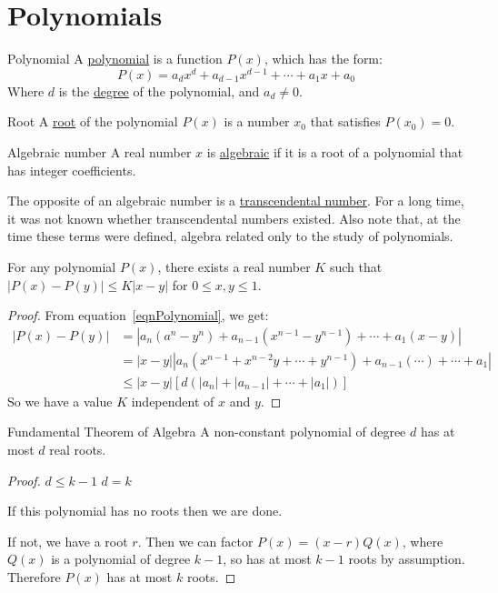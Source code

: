 \documentclass[../Main.tex]{subfiles}
\begin{document}
\section{Polynomials}
\begin{definition}{Polynomial}
    A \underline{polynomial} is a function $P(x)$, which has the form:
    \begin{equation}
        P(x) = a_d x^d + a_{d-1} x^{d-1} + \cdots + a_1 x + a_0
        \label{eqnPolynomial}
    \end{equation}
    Where $d$ is the \underline{degree} of the polynomial, and $a_d \neq 0$.
\end{definition}
\begin{definition}{Root}
    A \underline{root} of the polynomial $P(x)$ is a number $x_0$ that satisfies $P(x_0) = 0$.
\end{definition}
\begin{definition}{Algebraic number}
    A real number $x$ is \underline{algebraic} if it is a root of a polynomial that has integer coefficients.
\end{definition}
The opposite of an algebraic number is a \underline{transcendental number}. For a long time, it was not known whether transcendental numbers existed. Also note that, at the time these terms were defined, algebra related only to the study of polynomials.
\begin{lemma}
    For any polynomial $P(x)$, there exists a real number $K$ such that $|P(x) - P(y)| \leq K|x - y|$ for $0 \leq x, y \leq 1$.
    \label{lemPolynomialBounds}
\end{lemma}
\begin{proof}
    From equation~\ref{eqnPolynomial}, we get:
    \begin{align*}
        |P(x) - P(y)| &= |a_n(a^n - y^n) + a_{n-1}(x^{n-1} - y^{n-1}) + \cdots + a_1(x-y)| \\
        &= |x - y| |a_n(x^{n-1} + x^{n-2} y + \cdots + y^{n-1}) + a_{n-1} (\cdots) + \cdots + a_1| \\
        &\leq |x - y| \left[d(|a_n| + |a_{n-1}| + \cdots + |a_1|)\right]
    \end{align*}
    So we have a value $K$ independent of $x$ and $y$.
\end{proof}
\begin{theorem}{Fundamental Theorem of Algebra}
    A non-constant polynomial of degree $d$ has at most $d$ real roots.
    \label{thmFundamentalAlgebra}
\end{theorem}
\begin{proof}
    {$d \leq k - 1$}{}
    {$d = k$}{
        If this polynomial has no roots then we are done.\par
        If not, we have a root $r$. Then we can factor $P(x) = (x - r)Q(x)$, where $Q(x)$ is a polynomial of degree $k - 1$, so has at most $k - 1$ roots by assumption. Therefore $P(x)$ has at most $k$ roots.
    }
\end{proof}
\end{document}
